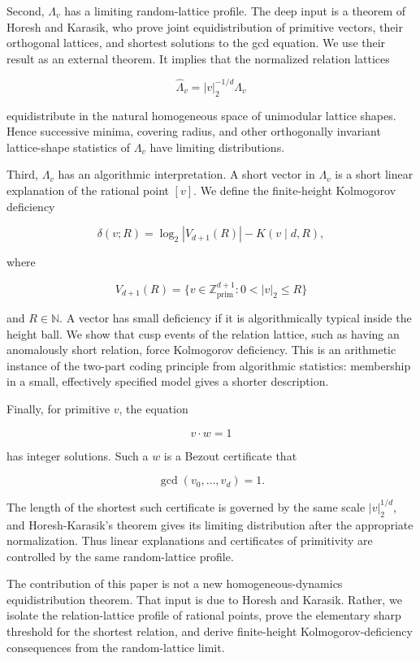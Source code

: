 \documentclass[11pt]{article}
\begin{document}
Second, $\Lambda_v$ has a limiting random-lattice profile. The deep input is a theorem of Horesh and Karasik, who prove joint equidistribution of primitive vectors, their orthogonal lattices, and shortest solutions to the gcd equation. We use their result as an external theorem. It implies that the normalized relation lattices

\[
\widehat\Lambda_v=|v|_2^{-1/d}\Lambda_v
\]

equidistribute in the natural homogeneous space of unimodular lattice shapes. Hence successive minima, covering radius, and other orthogonally invariant lattice-shape statistics of $\Lambda_v$ have limiting distributions.

Third, $\Lambda_v$ has an algorithmic interpretation. A short vector in $\Lambda_v$ is a short linear explanation of the rational point $[v]$. We define the finite-height Kolmogorov deficiency

\[
\delta(v;R)=\log_2|V_{d+1}(R)|-K(v\mid d,R),
\]

where

\[
V_{d+1}(R)=\{v\in\mathbb Z^{d+1}_{\mathrm{prim}}:0<|v|_2\le R\}
\]

and $R\in\mathbb N$. A vector has small deficiency if it is algorithmically typical inside the height ball. We show that cusp events of the relation lattice, such as having an anomalously short relation, force Kolmogorov deficiency. This is an arithmetic instance of the two-part coding principle from algorithmic statistics: membership in a small, effectively specified model gives a shorter description.

Finally, for primitive $v$, the equation

\[
v\cdot w=1
\]

has integer solutions. Such a $w$ is a Bezout certificate that

\[
\gcd(v_0,\dots,v_d)=1.
\]

The length of the shortest such certificate is governed by the same scale $|v|_2^{1/d}$, and Horesh-Karasik's theorem gives its limiting distribution after the appropriate normalization. Thus linear explanations and certificates of primitivity are controlled by the same random-lattice profile.

The contribution of this paper is not a new homogeneous-dynamics equidistribution theorem. That input is due to Horesh and Karasik. Rather, we isolate the relation-lattice profile of rational points, prove the elementary sharp threshold for the shortest relation, and derive finite-height Kolmogorov-deficiency consequences from the random-lattice limit.
\end{document}
